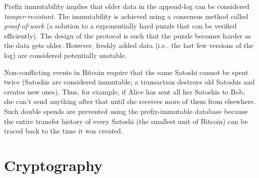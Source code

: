 \documentclass[]{report}   %
\begin{document}
Prefix immutability implies that older data in the append-log can be considered {\em tamper-resistant}. The immutability is achieved using a consensus method called {\em proof-of-work} (a solution to a exponentially hard puzzle that can be verified efficiently). The design of the protocol is such that the puzzle becomes harder as the data gets older. However, freshly added data (i.e., the last few versions of the log) are considered potentially unstable. 

Non-conflicting events in Bitcoin require that the same Satoshi cannot be spent twice (Satoshis are considered immutable; a transaction destroys old Satoshis and creates new ones). Thus, for example, if Alice has sent all her Satoshis to Bob, she can't send anything after that until she receives more of them from elsewhere.
Such double spends are prevented using the prefix-immutable database because the entire transfer history of every Satoshi (the smallest unit of Bitcoin) can be traced back to the time it was created. 


%
%

\section{Cryptography}
\end{document}

